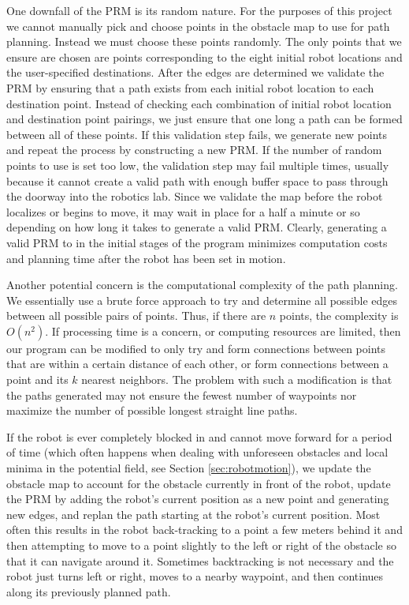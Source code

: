 \documentclass[12pt]{article}
\begin{document}
One downfall of the PRM is its random nature. For the purposes of this project we cannot manually pick and choose points in the obstacle map to use for path planning. Instead we must choose these points randomly. The only points that we ensure are chosen are points corresponding to the eight initial robot locations and the user-specified destinations. After the edges are determined we validate the PRM by ensuring that a path exists from each initial robot location to each destination point. Instead of checking each combination of initial robot location and destination point pairings, we just ensure that one long a path can be formed between all of these points. If this validation step fails, we generate new points and repeat the process by constructing a new PRM. If the number of random points to use is set too low, the validation step may fail multiple times, usually because it cannot create a valid path with enough buffer space to pass through the doorway into the robotics lab. Since we validate the map before the robot localizes or begins to move, it may wait in place for a half a minute or so depending on how long it takes to generate a valid PRM. Clearly, generating a valid PRM to in the initial stages of the program minimizes computation costs and planning time after the robot has been set in motion.

Another potential concern is the computational complexity of the path planning. We essentially use a brute force approach to try and determine all possible edges between all possible pairs of points. Thus, if there are $n$ points, the complexity is $O(n^2)$. If processing time is a concern, or computing resources are limited, then our program can be modified to only try and form connections between points that are within a certain distance of each other, or form connections between a point and its $k$ nearest neighbors. The problem with such a modification is that the paths generated may not ensure the fewest number of waypoints nor maximize the number of possible longest straight line paths.

If the robot is ever completely blocked in and cannot move forward for a period of time (which often happens when dealing with unforeseen obstacles and local minima in the potential field, see Section \ref{sec:robotmotion}), we update the obstacle map to account for the obstacle currently in front of the robot, update the PRM by adding the robot's current position as a new point and generating new edges, and replan the path starting at the robot's current position. Most often this results in the robot back-tracking to a point a few meters behind it and then attempting to move to a point slightly to the left or right of the obstacle so that it can navigate around it. Sometimes backtracking is not necessary and the robot just turns left or right, moves to a nearby waypoint, and then continues along its previously planned path.
\end{document}
